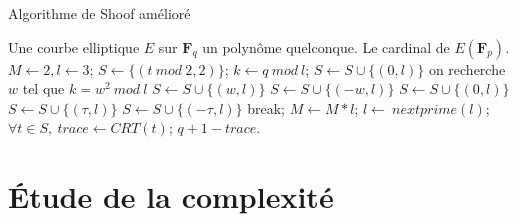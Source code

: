 \documentclass{article}%
\theoremstyle{plain}
\theoremstyle{definition}
\theoremstyle{plain}
\theoremstyle{remark}
\newcommand\fq{\mathbf{F}_{q}}
\begin{document}
\begin{algorithm}
\caption{Algorithme de Shoof amélioré}
\label{schoof2}
\begin{algorithmic} 
\REQUIRE Une courbe elliptique $E$ sur $\fq$ un polynôme quelconque.
\ENSURE Le cardinal de $E(\mathbf{F}_{p})$.
\STATE $M\leftarrow 2, l\leftarrow 3$;
\STATE $S\leftarrow \{(t\ mod\ 2, 2)\}$; 
    \STATE $k\leftarrow q\ mod\ l$;	
            \STATE $S\leftarrow S\cup \{(0, l)\}$
            \ELSE
                \STATE on recherche $w$ tel que $k=w^{2}\ mod\ l$
                    \STATE $S\leftarrow S\cup \{(w, l)\}$ \OR $S\leftarrow S\cup \{(-w, l)\}$ 
                \ELSE
                    \STATE $S\leftarrow S\cup \{(0, l)\}$
                \ENDIF
            \ENDIF
    \ELSE
                \STATE $S\leftarrow S\cup \{(\tau, l)\}$ \OR $S\leftarrow S\cup \{(-\tau, l)\}$ 
                \STATE break;
            \ENDIF
        \ENDFOR
    \ENDIF
    \STATE $M\leftarrow M*l$;
    \STATE $l\leftarrow\ nextprime(l)$; 	
\ENDWHILE
\STATE $\forall t\in S,\ trace\leftarrow CRT(t)$; 
\RETURN $q + 1 - trace$.
\end{algorithmic}
\end{algorithm}

\clearpage 

\section{Étude de la complexité}




 
\clearpage 
\nocite{*} 


\end{document}
